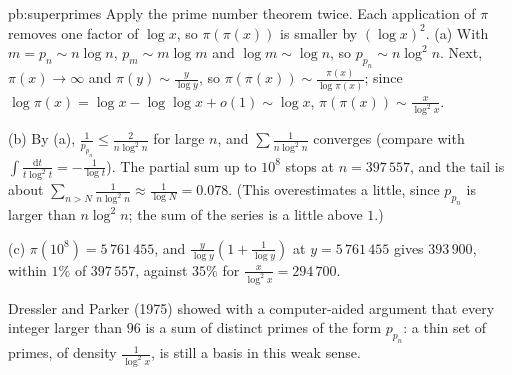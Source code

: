 \begin{solution}{pb:superprimes}
\idea Apply the prime number theorem twice. Each application of $\pi$ removes one factor of $\log x$, so $\pi(\pi(x))$ is smaller by $(\log x)^2$.
\writeup (a) With $m=p_n\sim n\log n$, $p_m\sim m\log m$ and $\log m\sim\log n$, so $p_{p_n}\sim n\log^2n$. Next, $\pi(x)\to\infty$ and $\pi(y)\sim\frac y{\log y}$, so
$\pi(\pi(x))\sim\frac{\pi(x)}{\log\pi(x)}$; since $\log\pi(x)=\log x-\log\log x+o(1)\sim\log x$, $\pi(\pi(x))\sim\frac x{\log^2x}$.

(b) By (a), $\frac1{p_{p_n}}\le\frac2{n\log^2n}$ for large $n$, and $\sum\frac1{n\log^2n}$ converges (compare with $\int\frac{\mathrm dt}{t\log^2t}=-\frac1{\log t}$). The partial sum up to $10^8$ stops at
$n=397\,557$, and the tail is about $\sum_{n>N}\frac1{n\log^2n}\approx\frac1{\log N}=0.078$. (This overestimates a little, since $p_{p_n}$ is larger than $n\log^2n$; the sum
of the series is a little above $1$.)

(c) $\pi(10^8)=5\,761\,455$, and $\frac y{\log y}(1+\frac1{\log y})$ at $y=5\,761\,455$ gives $393\,900$, within $1\%$ of $397\,557$, against $35\%$ for $\frac x{\log^2x}=294\,700$.

\leads Dressler and Parker (1975) showed with a computer-aided argument that every integer larger than $96$ is a sum of distinct primes of the form $p_{p_n}$: a thin set of primes,
of density $\frac1{\log^2x}$, is still a basis in this weak sense.
\end{solution}

